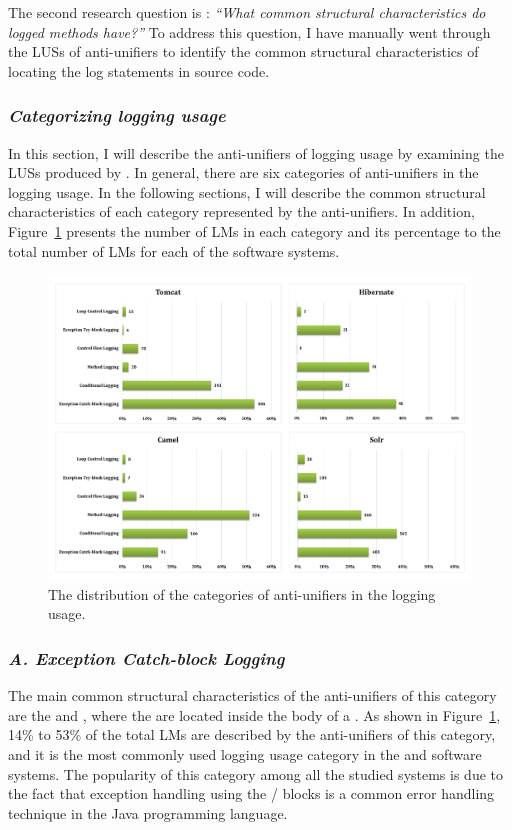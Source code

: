 The second research question is : \emph{``What common structural characteristics do logged methods have?''}
To address this question, I have manually went through the LUSs of anti-unifiers to identify the common structural characteristics of locating the log statements in source code.


\subsubsection{\emph{Categorizing logging usage}}
In this section, I will describe the anti-unifiers of logging usage by examining the LUSs produced by . In general, there are six categories of anti-unifiers in the logging usage. In the following sections, I will describe the common structural characteristics of each category represented by the anti-unifiers. In addition, Figure~\ref{fig:categories} presents the number of LMs in each category and its percentage to the total number of LMs for each of the software systems.

\begin{figure} [H]
  \centering\includegraphics [width = 1\textwidth]{Charts/Categories.png}
  \caption{The distribution of the categories of anti-unifiers in the logging usage.}
  \label{fig:categories}
\end{figure}


\subsubsection{\emph{A. Exception Catch-block Logging}}  \label{Exception catch-block logging}
The main common structural characteristics of the anti-unifiers of this category are the  and  , where the  are located inside the body of a . As shown in Figure~\ref{fig:categories}, 14\% to 53\% of the total LMs are described by the anti-unifiers of this category, and it is the most commonly used logging usage category in the  and  software systems. The popularity of this category among all the studied systems is due to the fact that exception handling using the / blocks is a common error handling technique in the Java programming language.

